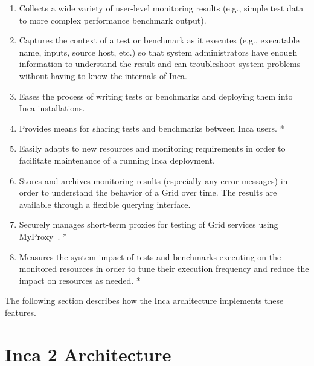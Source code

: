 \documentclass{sig-alternate}
\begin{document}
\begin{enumerate}

\item Collects a wide variety of user-level monitoring results (e.g., simple
test data to more complex performance benchmark output).  

\item Captures the context of a test or benchmark as it executes (e.g.,
executable name, inputs, source host, etc.) so that system administrators have
enough information to understand the result and can troubleshoot system
problems without having to know the internals of Inca. 

\item Eases the process of writing tests or benchmarks and deploying them into
Inca installations. 

\item Provides means for sharing tests and benchmarks between Inca users. *

\item Easily adapts to new resources and monitoring requirements in order to
facilitate maintenance of a running Inca deployment. 

\item Stores and archives monitoring results (especially any error messages) 
in order to understand the behavior of a Grid over time. The results
are available through a flexible querying interface.

\item Securely manages short-term proxies for testing of Grid services using
MyProxy~\cite{myproxy}. *

\item Measures the system impact of tests and benchmarks executing on
the monitored resources in order to tune their execution frequency and
reduce the impact on resources as needed. *

\end{enumerate}

\noindent The following section describes how the Inca architecture implements
these features.

\section{Inca 2 Architecture}
\end{document}
